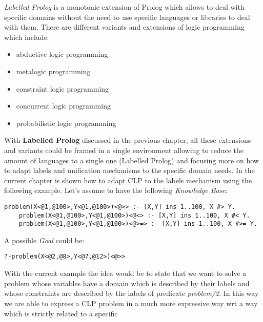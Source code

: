 \textit{Labelled Prolog} is a monotonic extension of Prolog which allows to deal with specific domains
without the need to use specific languages or libraries to deal with them.\newline
There are different variants and extensions of logic programming which include:
\begin{itemize}
    \item abductive logic programming \cite{10.1093/logcom/2.6.719}
    \item metalogic programming  \cite{10.5555/94469}
    \item constraint logic programming \cite{JAFFAR1994503}
    \item concurrent logic programming \cite{10.1145/800223.806776}
    \item probabilistic logic programming \cite{NG1992150}
\end{itemize}
With \textbf{Labelled Prolog} discussed in the previous chapter, all these extensions and
variants could be framed in a single environment allowing to reduce the amount of languages to a single one (Labelled Prolog) and
focusing more on how to adapt labels and unification mechanisms to the specific domain needs.\newline\newline
In the current chapter is shown how to adapt CLP to the labels mechanism using the following example.\newline
Let's assume to have the following \textit{Knowledge Base}:\newline
\begin{lstlisting}[label=program1, frame=none, mathescape, language=tuProlog, caption={}]
    problem(X<@1,@100>,Y<@1,@100>)<@>> :- [X,Y] ins 1..100, X #> Y.
    problem(X<@1,@100>,Y<@1,@100>)<@<> :- [X,Y] ins 1..100, X #< Y.
    problem(X<@1,@100>,Y<@1,@100>)<@>=> :- [X,Y] ins 1..100, X #>= Y.
\end{lstlisting}
A possible \textit{Goal} could be:
\begin{lstlisting}[label=program1, frame=none, mathescape, language=tuProlog, caption={}]
    ?-problem(X<@2,@8>,Y<@7,@12>)<@>>
\end{lstlisting}
With the current example the idea would be to state that we want to solve a problem whose variables have a domain
which is described by their labels and whose constraints are described by the labels of predicate \textit{problem/2}.\newline
In this way we are able to express a CLP problem in a much more expressive way wrt a way which is strictly related to a specific
